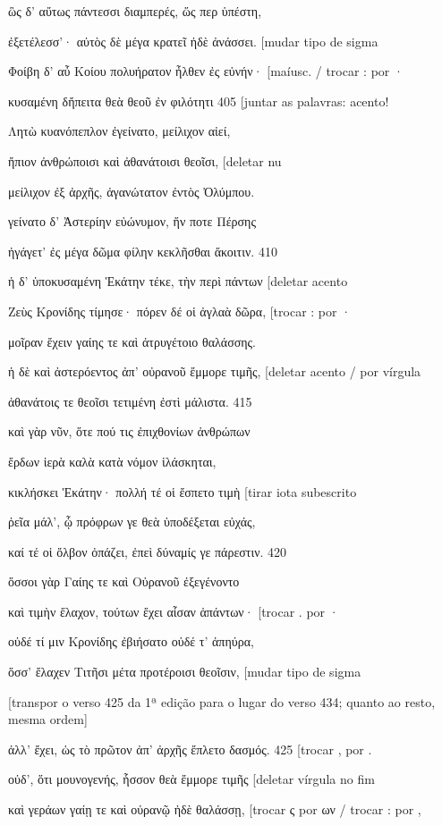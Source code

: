 ὣς δ' αὔτως πάντεσσι διαμπερές, ὥς περ ὑπέστη,

ἐξετέλεσσ'· αὐτὸς δὲ μέγα κρατεῖ ἠδὲ ἀνάσσει. {[}mudar tipo de sigma

Φοίβη δ' αὖ Κοίου πολυήρατον ἦλθεν ἐς εὐνήν· {[}maíusc. / trocar : por ·

κυσαμένη δἤπειτα θεὰ θεοῦ ἐν φιλότητι 405 {[}juntar as palavras: acento!

Λητὼ κυανόπεπλον ἐγείνατο, μείλιχον αἰεί,

ἤπιον ἀνθρώποισι καὶ ἀθανάτοισι θεοῖσι, {[}deletar nu

μείλιχον ἐξ ἀρχῆς, ἀγανώτατον ἐντὸς Ὀλύμπου.

γείνατο δ' Ἀστερίην εὐώνυμον, ἥν ποτε Πέρσης

ἠγάγετ' ἐς μέγα δῶμα φίλην κεκλῆσθαι ἄκοιτιν. 410

ἡ δ' ὑποκυσαμένη Ἑκάτην τέκε, τὴν περὶ πάντων {[}deletar acento

Ζεὺς Κρονίδης τίμησε· πόρεν δέ οἱ ἀγλαὰ δῶρα, {[}trocar : por ·

μοῖραν ἔχειν γαίης τε καὶ ἀτρυγέτοιο θαλάσσης.

ἡ δὲ καὶ ἀστερόεντος ἀπ' οὐρανοῦ ἔμμορε τιμῆς, {[}deletar acento / por
vírgula

ἀθανάτοις τε θεοῖσι τετιμένη ἐστὶ μάλιστα. 415

καὶ γὰρ νῦν, ὅτε πού τις ἐπιχθονίων ἀνθρώπων

ἔρδων ἱερὰ καλὰ κατὰ νόμον ἱλάσκηται,

κικλήσκει Ἑκάτην· πολλή τέ οἱ ἔσπετο τιμὴ {[}tirar iota subescrito

ῥεῖα μάλ', ᾧ πρόφρων γε θεὰ ὑποδέξεται εὐχάς,

καί τέ οἱ ὄλβον ὀπάζει, ἐπεὶ δύναμίς γε πάρεστιν. 420

ὅσσοι γὰρ Γαίης τε καὶ Οὐρανοῦ ἐξεγένοντο

καὶ τιμὴν ἔλαχον, τούτων ἔχει αἶσαν ἁπάντων· {[}trocar . por ·

οὐδέ τί μιν Κρονίδης ἐβιήσατο οὐδέ τ' ἀπηύρα,

ὅσσ' ἔλαχεν Τιτῆσι μέτα προτέροισι θεοῖσιν, {[}mudar tipo de sigma

{[}transpor o verso 425 da 1ª edição para o lugar do verso 434; quanto
ao resto, mesma ordem{]}

ἀλλ' ἔχει, ὡς τὸ πρῶτον ἀπ' ἀρχῆς ἔπλετο δασμός. 425 {[}trocar , por .

οὐδ', ὅτι μουνογενής, ἧσσον θεὰ ἔμμορε τιμῆς {[}deletar vírgula no fim

καὶ γεράων γαίῃ τε καὶ οὐρανῷ ἠδὲ θαλάσσῃ, {[}trocar ς por ων / trocar :
por ,

